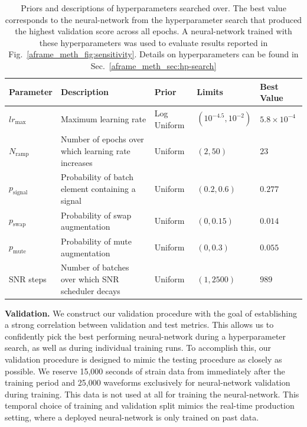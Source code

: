 \begin{refsection}
\begin{table}
\centering
\small
\begin{tabular}{ p{1.8cm} p{4.0cm} p{2.0cm} p{2.0cm} p{2.2cm} }
\hline
\hline
Parameter & Description & Prior & Limits & Best Value \\
\hline
$lr_{\text{max}}$ & Maximum learning rate & Log Uniform  &  $(10^{-4.5}, 10^{-2})$  & $5.8\times10^{-4}$\\
$N_{\text{ramp}}$ & Number of epochs over which learning rate increases & Uniform & $(2, 50)$ & $23$ \\
$p_{\text{signal}}$ & Probability of batch element containing a signal & Uniform & $(0.2, 0.6)$ & $0.277$\\
$p_{\text{swap}}$ & Probability of swap augmentation & Uniform & $(0, 0.15)$ & $0.014$\\
$p_{\text{mute}}$ & Probability of mute augmentation & Uniform & $(0, 0.3)$ & $0.055$ \\
SNR steps & Number of batches over which SNR scheduler decays & Uniform & $(1, 2500)$ & $989$\\
\hline
\hline
\end{tabular}
\caption[Priors and descriptions of \aframe hyperparameters searched over]{Priors and descriptions of hyperparameters searched over. 
The best value corresponds to the neural-network from the hyperparameter search that produced the highest validation score across all epochs. 
A neural-network trained with these hyperparameters was used to evaluate results reported in Fig.~\ref{aframe_meth_fig:sensitivity}. 
Details on hyperparameters can be found in Sec.~\ref{aframe_meth_sec:hp-search}}
\label{aframe_meth_tab:hp-priors}
\end{table}

\textbf{Validation.}
We construct our validation procedure with the goal of establishing a strong correlation between validation and test metrics. 
This allows us to confidently pick the best performing neural-network during a hyperparameter search, as well as during individual training runs. 
To accomplish this, our validation procedure is designed to mimic the testing procedure as closely as possible. 
We reserve 15,000 seconds of strain data from immediately after the training period and 25,000 waveforms exclusively for neural-network validation during training. 
This data is not used at all for training the neural-network. 
This temporal choice of training and validation split mimics the real-time production setting, where a deployed neural-network is only trained on past data. 


\end{refsection}
